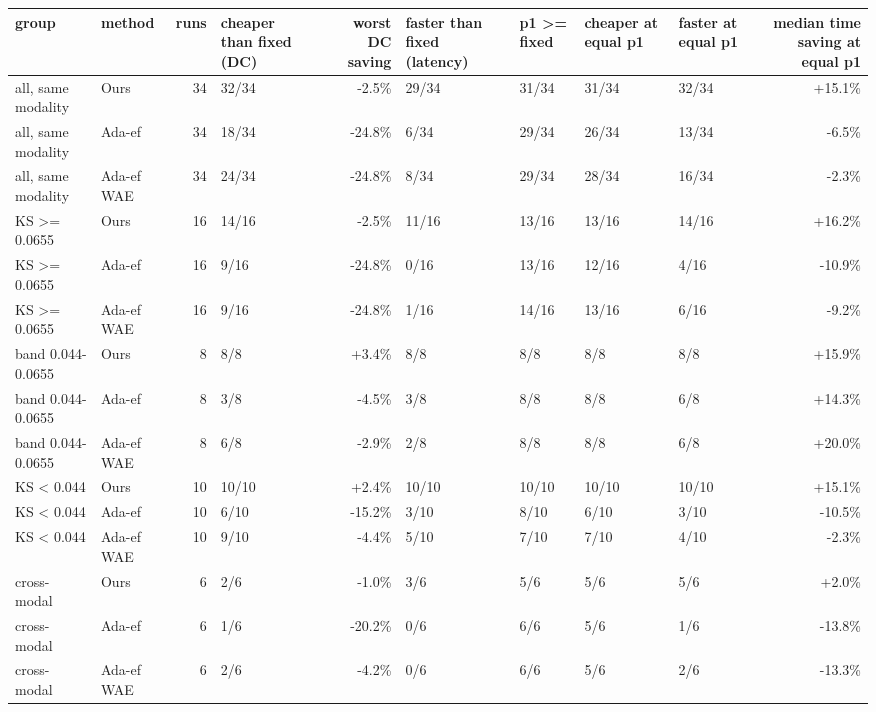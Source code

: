 \begin{tabular}{llrlrllllr}
\toprule
group & method & runs & cheaper than fixed (DC) & worst DC saving & faster than fixed (latency) & p1 >= fixed & cheaper at equal p1 & faster at equal p1 & median time saving at equal p1 \\
\midrule
all, same modality & Ours & 34 & 32/34 & -2.5\% & 29/34 & 31/34 & 31/34 & 32/34 & +15.1\% \\
all, same modality & Ada-ef & 34 & 18/34 & -24.8\% & 6/34 & 29/34 & 26/34 & 13/34 & -6.5\% \\
all, same modality & Ada-ef WAE & 34 & 24/34 & -24.8\% & 8/34 & 29/34 & 28/34 & 16/34 & -2.3\% \\
KS >= 0.0655 & Ours & 16 & 14/16 & -2.5\% & 11/16 & 13/16 & 13/16 & 14/16 & +16.2\% \\
KS >= 0.0655 & Ada-ef & 16 & 9/16 & -24.8\% & 0/16 & 13/16 & 12/16 & 4/16 & -10.9\% \\
KS >= 0.0655 & Ada-ef WAE & 16 & 9/16 & -24.8\% & 1/16 & 14/16 & 13/16 & 6/16 & -9.2\% \\
band 0.044-0.0655 & Ours & 8 & 8/8 & +3.4\% & 8/8 & 8/8 & 8/8 & 8/8 & +15.9\% \\
band 0.044-0.0655 & Ada-ef & 8 & 3/8 & -4.5\% & 3/8 & 8/8 & 8/8 & 6/8 & +14.3\% \\
band 0.044-0.0655 & Ada-ef WAE & 8 & 6/8 & -2.9\% & 2/8 & 8/8 & 8/8 & 6/8 & +20.0\% \\
KS < 0.044 & Ours & 10 & 10/10 & +2.4\% & 10/10 & 10/10 & 10/10 & 10/10 & +15.1\% \\
KS < 0.044 & Ada-ef & 10 & 6/10 & -15.2\% & 3/10 & 8/10 & 6/10 & 3/10 & -10.5\% \\
KS < 0.044 & Ada-ef WAE & 10 & 9/10 & -4.4\% & 5/10 & 7/10 & 7/10 & 4/10 & -2.3\% \\
cross-modal & Ours & 6 & 2/6 & -1.0\% & 3/6 & 5/6 & 5/6 & 5/6 & +2.0\% \\
cross-modal & Ada-ef & 6 & 1/6 & -20.2\% & 0/6 & 6/6 & 5/6 & 1/6 & -13.8\% \\
cross-modal & Ada-ef WAE & 6 & 2/6 & -4.2\% & 0/6 & 6/6 & 5/6 & 2/6 & -13.3\% \\
\bottomrule
\end{tabular}
